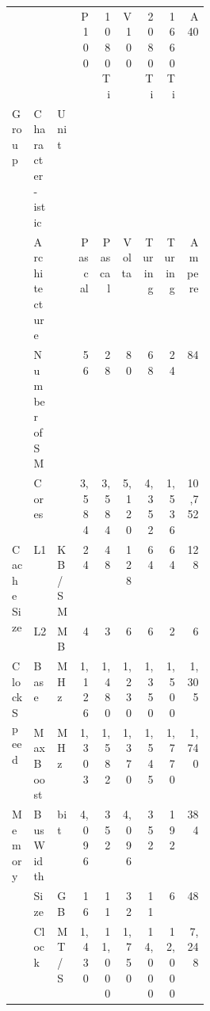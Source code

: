 \begin{tabular}{p{0.11\linewidth}p{0.12\linewidth}p{0.06\linewidth}rrrrrr}
    \toprule
                                                  &                          &        & P100   & 1080Ti & V100    & 2080Ti & 1660Ti & A40     \\
    Group                                         & Character-\newline istic & Unit   &        &        &         &        &        &         \\
    \midrule\midrule
    \multirow[t]{3}{\linewidth}{}                 & Architecture             &        & Pascal & Pascal & Volta   & Turing & Turing & Ampere  \\
    \cline{2-9}
                                                  & Number of SM             &        & 56     & 28     & 80      & 68     & 24     & 84      \\
    \cline{2-9}
                                                  & Cores                    &        & 3,584  & 3,584  & 5,120   & 4,352  & 1,536  & 10,752  \\
    \cline{1-9} \cline{2-9}
    \multirow[t]{2}{\linewidth}{Cache Size}       & L1                       & KB/SM  & 24     & 48     & 128     & 64     & 64     & 128     \\
    \cline{2-9}
                                                  & L2                       & MB     & 4      & 3      & 6       & 6      & 2      & 6       \\
    \cline{1-9} \cline{2-9}
    \multirow[t]{2}{\linewidth}{Clock Speed}      & Base                     & MHz    & 1,126  & 1,480  & 1,230   & 1,350  & 1,500  & 1,305   \\
    \cline{2-9}
                                                  & Max Boost                & MHz    & 1,303  & 1,582  & 1,370   & 1,545  & 1,770  & 1,740   \\
    \cline{1-9} \cline{2-9}
    \multirow[t]{4}{\linewidth}{Memory}           & Bus Width                & bit    & 4,096  & 352    & 4,096   & 352    & 192    & 384     \\
    \cline{2-9}
                                                  & Size                     & GB     & 16     & 11     & 32      & 11     & 6      & 48      \\
    \cline{2-9}
                                                  & Clock                    & MT/S   & 1,430  & 11,000 & 1,750   & 14,000 & 12,000 & 7,248   \\

\end{tabular}
